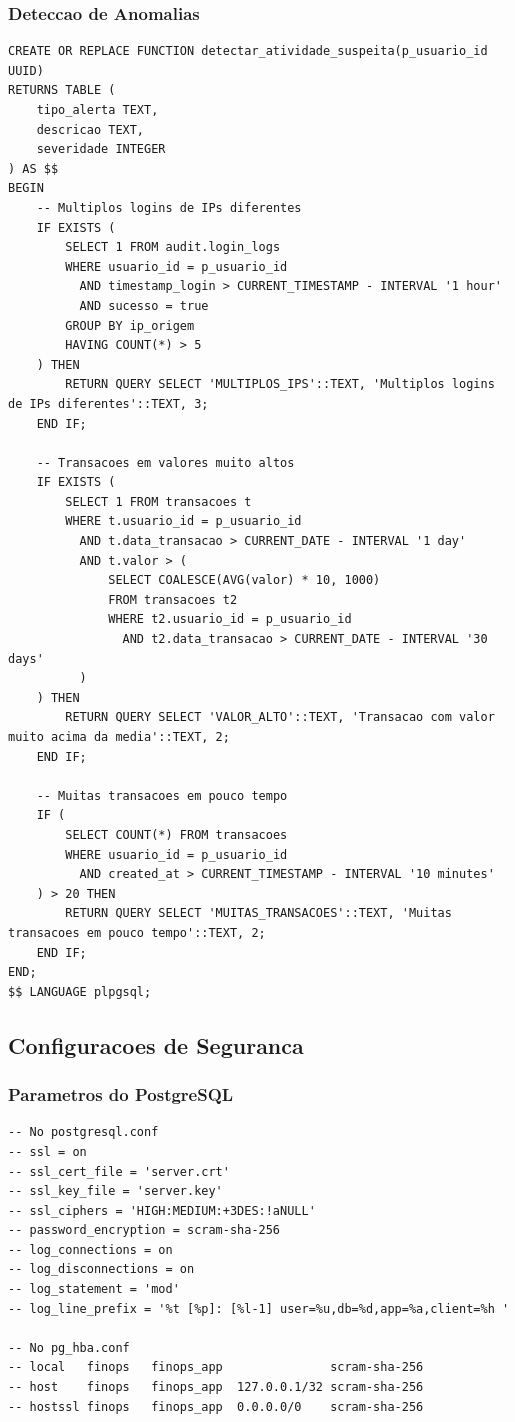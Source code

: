 \subsubsection{Deteccao de Anomalias}

\begin{lstlisting}[caption=Funcao para detectar atividades suspeitas]
CREATE OR REPLACE FUNCTION detectar_atividade_suspeita(p_usuario_id UUID)
RETURNS TABLE (
    tipo_alerta TEXT,
    descricao TEXT,
    severidade INTEGER
) AS $$
BEGIN
    -- Multiplos logins de IPs diferentes
    IF EXISTS (
        SELECT 1 FROM audit.login_logs 
        WHERE usuario_id = p_usuario_id 
          AND timestamp_login > CURRENT_TIMESTAMP - INTERVAL '1 hour'
          AND sucesso = true
        GROUP BY ip_origem 
        HAVING COUNT(*) > 5
    ) THEN
        RETURN QUERY SELECT 'MULTIPLOS_IPS'::TEXT, 'Multiplos logins de IPs diferentes'::TEXT, 3;
    END IF;
    
    -- Transacoes em valores muito altos
    IF EXISTS (
        SELECT 1 FROM transacoes t
        WHERE t.usuario_id = p_usuario_id
          AND t.data_transacao > CURRENT_DATE - INTERVAL '1 day'
          AND t.valor > (
              SELECT COALESCE(AVG(valor) * 10, 1000) 
              FROM transacoes t2 
              WHERE t2.usuario_id = p_usuario_id 
                AND t2.data_transacao > CURRENT_DATE - INTERVAL '30 days'
          )
    ) THEN
        RETURN QUERY SELECT 'VALOR_ALTO'::TEXT, 'Transacao com valor muito acima da media'::TEXT, 2;
    END IF;
    
    -- Muitas transacoes em pouco tempo
    IF (
        SELECT COUNT(*) FROM transacoes 
        WHERE usuario_id = p_usuario_id 
          AND created_at > CURRENT_TIMESTAMP - INTERVAL '10 minutes'
    ) > 20 THEN
        RETURN QUERY SELECT 'MUITAS_TRANSACOES'::TEXT, 'Muitas transacoes em pouco tempo'::TEXT, 2;
    END IF;
END;
$$ LANGUAGE plpgsql;
\end{lstlisting}

\subsection{Configuracoes de Seguranca}

\subsubsection{Parametros do PostgreSQL}

\begin{lstlisting}[caption=Configuracoes recomendadas de seguranca]
-- No postgresql.conf
-- ssl = on
-- ssl_cert_file = 'server.crt'
-- ssl_key_file = 'server.key'
-- ssl_ciphers = 'HIGH:MEDIUM:+3DES:!aNULL'
-- password_encryption = scram-sha-256
-- log_connections = on
-- log_disconnections = on
-- log_statement = 'mod'
-- log_line_prefix = '%t [%p]: [%l-1] user=%u,db=%d,app=%a,client=%h '

-- No pg_hba.conf
-- local   finops   finops_app               scram-sha-256
-- host    finops   finops_app  127.0.0.1/32 scram-sha-256
-- hostssl finops   finops_app  0.0.0.0/0    scram-sha-256
\end{lstlisting}

